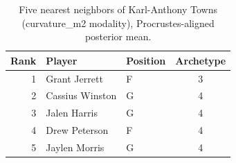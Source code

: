 \begin{table}[htbp]
  \centering\small
  \begin{tabular}{rllc}
    \toprule
    Rank & Player & Position & Archetype \\
    \midrule
    1 & Grant Jerrett & F & 3 \\
    2 & Cassius Winston & G & 4 \\
    3 & Jalen Harris & G & 4 \\
    4 & Drew Peterson & F & 4 \\
    5 & Jaylen Morris & G & 4 \\
    \bottomrule
  \end{tabular}
  \caption{Five nearest neighbors of Karl-Anthony Towns (curvature_m2 modality), Procrustes-aligned posterior mean.}
  \label{tab:Karl_Anthony_Towns_neighbors_curvature_m2}
\end{table}

